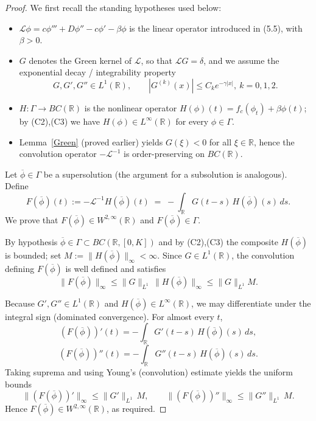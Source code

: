 \documentclass[10pt,a4paper]{amsart}
\begin{document}
 \begin{proof}
 	We first recall the standing hypotheses used below:
 	\begin{itemize}
 		\item $\mathcal L\phi=c\phi''' + D\phi'' - c\phi' -\beta\phi$ is the linear operator introduced in (5.5), with $\beta>0$.
 		\item $G$ denotes the Green kernel of $\mathcal L$, so that $\mathcal L G=\delta$, and we assume the exponential decay / integrability property
 		$$G,G',G''\in L^1(\mathbb R),\qquad |G^{(k)}(x)|\le C_k e^{-\gamma|x|},\ k=0,1,2.$$
 		\item $H:\Gamma\to BC(\mathbb R)$ is the nonlinear operator $H(\phi)(t)=f_c(\phi_t)+\beta\phi(t)$; by (C2),(C3) we have $H(\phi)\in L^\infty(\mathbb R)$ for every $\phi\in\Gamma$.
 		\item Lemma~\ref{Green} (proved earlier) yields $G(\xi)<0$ for all $\xi\in\mathbb R$, hence the convolution operator $-\mathcal L^{-1}$ is order-preserving on $BC(\mathbb R)$.
 	\end{itemize}
 	
 	Let $\overline\phi\in\Gamma$ be a supersolution (the argument for a subsolution is analogous). Define
 	\[
 	F(\overline\phi)(t) := -\mathcal L^{-1}H(\overline\phi)(t) \;=\; -\int_{\mathbb R} G(t-s)\,H(\overline\phi)(s)\,ds.
 	\]
 	We prove that $F(\overline\phi)\in W^{2,\infty}(\mathbb R)$ and $F(\overline\phi)\in\Gamma$.
 	
 	By hypothesis $\overline\phi\in\Gamma\subset BC(\mathbb R,[0,K])$ and by (C2),(C3)
 	the composite $H(\overline\phi)$ is bounded; set $M:=\|H(\overline\phi)\|_\infty<\infty$.
 	Since $G\in L^1(\mathbb R)$, the convolution defining $F(\overline\phi)$ is well defined
 	and satisfies
 	\[
 	\|F(\overline\phi)\|_\infty \le \|G\|_{L^1}\,\|H(\overline\phi)\|_\infty \le \|G\|_{L^1} M.
 	\]
 	
 	Because $G',G''\in L^1(\mathbb R)$ and $H(\overline\phi)\in L^\infty(\mathbb R)$,
 	we may differentiate under the integral sign (dominated convergence). For almost every $t$,
 	\[
 	(F(\overline\phi))'(t) = -\int_{\mathbb R} G'(t-s)\,H(\overline\phi)(s)\,ds,
 	\]
 	\[
 	(F(\overline\phi))''(t) = -\int_{\mathbb R} G''(t-s)\,H(\overline\phi)(s)\,ds.
 	\]
 	Taking suprema and using Young's (convolution) estimate yields the uniform bounds
 	\[
 	\|(F(\overline\phi))'\|_\infty \le \|G'\|_{L^1}\,M,\qquad
 	\|(F(\overline\phi))''\|_\infty \le \|G''\|_{L^1}\,M.
 	\]
 	Hence $F(\overline\phi)\in W^{2,\infty}(\mathbb R)$, as required.
 	

\end{proof}
\end{document}
